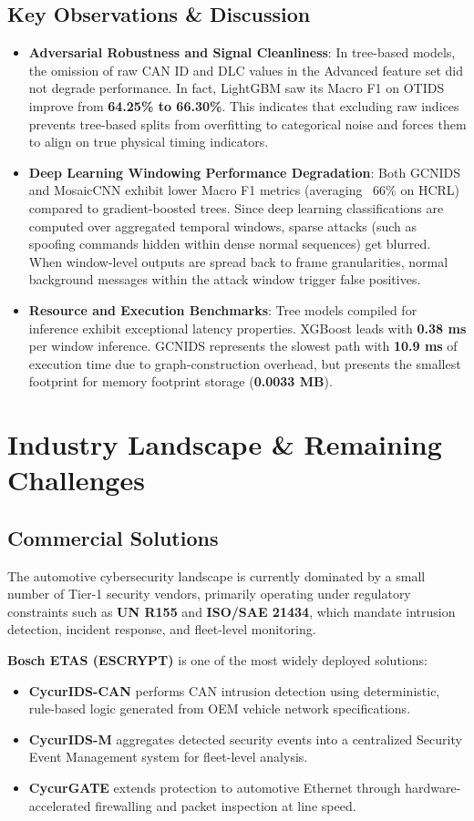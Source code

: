 \documentclass{article}
\begin{document}
\subsection{Key Observations \& Discussion}
\begin{itemize}
    \item \textbf{Adversarial Robustness and Signal Cleanliness}: In tree-based models, the omission of raw CAN ID and DLC values in the Advanced feature set did not degrade performance. In fact, LightGBM saw its Macro F1 on OTIDS improve from \textbf{64.25\% to 66.30\%}. This indicates that excluding raw indices prevents tree-based splits from overfitting to categorical noise and forces them to align on true physical timing indicators.
    \item \textbf{Deep Learning Windowing Performance Degradation}: Both GCNIDS and MosaicCNN exhibit lower Macro F1 metrics (averaging ~66\% on HCRL) compared to gradient-boosted trees. Since deep learning classifications are computed over aggregated temporal windows, sparse attacks (such as spoofing commands hidden within dense normal sequences) get blurred. When window-level outputs are spread back to frame granularities, normal background messages within the attack window trigger false positives.
    \item \textbf{Resource and Execution Benchmarks}: Tree models compiled for inference exhibit exceptional latency properties. XGBoost leads with \textbf{0.38 ms} per window inference. GCNIDS represents the slowest path with \textbf{10.9 ms} of execution time due to graph-construction overhead, but presents the smallest footprint for memory footprint storage (\textbf{0.0033 MB}).
\end{itemize}


\section{Industry Landscape \& Remaining Challenges}
\subsection{Commercial Solutions}
The automotive cybersecurity landscape is currently dominated by a small number of Tier-1 security vendors, primarily operating under regulatory constraints such as \textbf{UN R155} and \textbf{ISO/SAE 21434}, which mandate intrusion detection, incident response, and fleet-level monitoring.

\textbf{Bosch ETAS (ESCRYPT)} is one of the most widely deployed solutions:
\begin{itemize}[noitemsep]
    \item \textbf{CycurIDS-CAN} performs CAN intrusion detection using deterministic, rule-based logic generated from OEM vehicle network specifications.
    \item \textbf{CycurIDS-M} aggregates detected security events into a centralized Security Event Management system for fleet-level analysis.
    \item \textbf{CycurGATE} extends protection to automotive Ethernet through hardware-accelerated firewalling and packet inspection at line speed.
\end{itemize}
\end{document}
